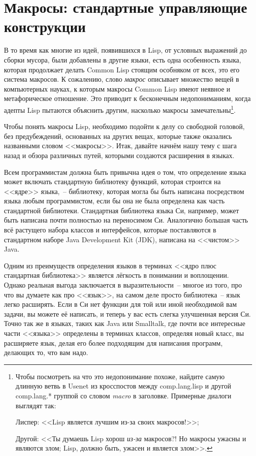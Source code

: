 \chapter{Макросы: стандартные управляющие конструкции}
\label{ch:07}

\thispagestyle{empty}

В то время как многие из идей, появившихся в Lisp, от условных выражений до сборки
мусора, были добавлены в другие языки, есть одна особенность языка, которая продолжает
делать Common Lisp стоящим особняком от всех, это его система макросов. К сожалению, слово
\textit{макрос} описывает множество вещей в компьютерных науках, к которым макросы Common Lisp
имеют неявное и метафорическое отношение. Это приводит к бесконечным недопониманиям,
когда адепты Lisp пытаются объяснить другим, насколько макросы
замечательны\footnote{Чтобы посмотреть на что это недопонимание похоже, найдите самую
  длинную ветвь в Usenet из кросспостов между comp.lang.lisp и другой comp.lang.* группой
  со словом \textit{macro} в заголовке. Примерные диалоги выглядят так:

Лиспер: <<Lisp является лучшим из-за своих макросов!>>;

Другой: <<Ты думаешь Lisp хорош \textit{из-за} макросов?! Но макросы ужасны и являются
злом; Lisp, должно быть, ужасен и является злом>>.}.

Чтобы понять макросы Lisp, необходимо подойти к делу со свободной головой, без
предубеждений, основанных на других вещах, которые также оказались названными словом
<<макросы>>. Итак, давайте начнём нашу тему с шага назад и обзора различных путей, которыми
создаются расширения в языках.

Всем программистам должна быть привычна идея о том, что определение языка может включать
стандартную библиотеку функций, которая строится на <<ядре>> языка,~-- библиотеку, которая
могла бы быть написана посредством языка любым прог\-рам\-мис\-том, если бы она не была
определена как часть стандартной библиотеки. Стандартная библиотека языка Си, например,
может быть написана почти полностью на переносимом Си. Аналогично большая часть всё
растущего набора классов и интерфейсов, которые поставляются в стандартном наборе Java
Development Kit (JDK), написана на <<чистом>> Java.

Одним из преимуществ определения языков в терминах <<ядро плюс стандартная библиотека>> является
лёгкость в понимании и воплощении. Однако реальная выгода заключается в выразительности~--
многое из того, про что вы думаете как про <<язык>>, на самом деле просто библиотека~-- язык
легко расширять. Если в Си нет функции для той или иной необходимой вам задачи, вы можете
её написать, и теперь у вас есть слегка улучшенная версия Си. Точно так же в языках, таких
как Java или Smalltalk, где почти все интересные части <<языка>> определены в терминах
классов, определяя новый класс, вы расширяете язык, делая его более подходящим для
написания программ, делающих то, что вам надо.

